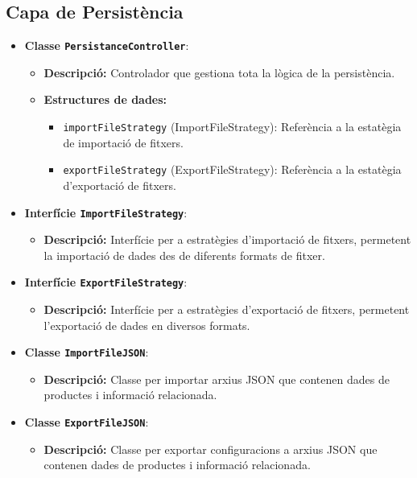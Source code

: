 \documentclass[a4paper,12pt]{report}
\begin{document}
\begin{itemize}
\subsection{Capa de Persistència}
\begin{itemize}
\item \textbf{Classe \texttt{PersistanceController}}:
	\begin{itemize}
		\item \textbf{Descripció:} Controlador que gestiona tota la lògica de la persistència.
		\item \textbf{Estructures de dades:}
		\begin{itemize}
			\item \texttt{importFileStrategy} (ImportFileStrategy): Referència a la estatègia de importació de fitxers.
			\item \texttt{exportFileStrategy} (ExportFileStrategy): Referència a la estatègia d'exportació de fitxers.
		\end{itemize}
	\end{itemize}	
\item \textbf{Interfície \texttt{ImportFileStrategy}}:
	\begin{itemize}
		\item \textbf{Descripció:} Interfície per a estratègies d'importació de fitxers, permetent la importació de dades des de diferents formats de fitxer.
	\end{itemize}
\item \textbf{Interfície \texttt{ExportFileStrategy}}:
	\begin{itemize}
		\item \textbf{Descripció:} Interfície per a estratègies d'exportació de fitxers, permetent l'exportació de dades en diversos formats.
	\end{itemize}
\item \textbf{Classe \texttt{ImportFileJSON}}:
		\begin{itemize}
			\item \textbf{Descripció:} Classe per importar arxius JSON que contenen dades de productes i informació relacionada.
		\end{itemize}
\item \textbf{Classe \texttt{ExportFileJSON}}:
		\begin{itemize}
			\item \textbf{Descripció:} Classe per exportar configuracions a arxius JSON que contenen dades de productes i informació relacionada.
		\end{itemize}
\end{itemize}


\end{itemize}
\end{document}

